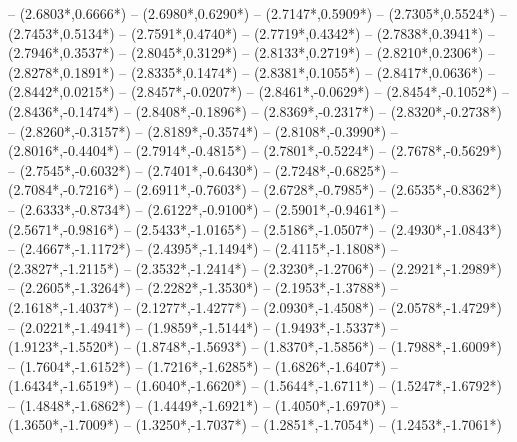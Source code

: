 {	-- ({2.6803*\dx},{0.6666*\dy})
	-- ({2.6980*\dx},{0.6290*\dy})
	-- ({2.7147*\dx},{0.5909*\dy})
	-- ({2.7305*\dx},{0.5524*\dy})
	-- ({2.7453*\dx},{0.5134*\dy})
	-- ({2.7591*\dx},{0.4740*\dy})
	-- ({2.7719*\dx},{0.4342*\dy})
	-- ({2.7838*\dx},{0.3941*\dy})
	-- ({2.7946*\dx},{0.3537*\dy})
	-- ({2.8045*\dx},{0.3129*\dy})
	-- ({2.8133*\dx},{0.2719*\dy})
	-- ({2.8210*\dx},{0.2306*\dy})
	-- ({2.8278*\dx},{0.1891*\dy})
	-- ({2.8335*\dx},{0.1474*\dy})
	-- ({2.8381*\dx},{0.1055*\dy})
	-- ({2.8417*\dx},{0.0636*\dy})
	-- ({2.8442*\dx},{0.0215*\dy})
	-- ({2.8457*\dx},{-0.0207*\dy})
	-- ({2.8461*\dx},{-0.0629*\dy})
	-- ({2.8454*\dx},{-0.1052*\dy})
	-- ({2.8436*\dx},{-0.1474*\dy})
	-- ({2.8408*\dx},{-0.1896*\dy})
	-- ({2.8369*\dx},{-0.2317*\dy})
	-- ({2.8320*\dx},{-0.2738*\dy})
	-- ({2.8260*\dx},{-0.3157*\dy})
	-- ({2.8189*\dx},{-0.3574*\dy})
	-- ({2.8108*\dx},{-0.3990*\dy})
	-- ({2.8016*\dx},{-0.4404*\dy})
	-- ({2.7914*\dx},{-0.4815*\dy})
	-- ({2.7801*\dx},{-0.5224*\dy})
	-- ({2.7678*\dx},{-0.5629*\dy})
	-- ({2.7545*\dx},{-0.6032*\dy})
	-- ({2.7401*\dx},{-0.6430*\dy})
	-- ({2.7248*\dx},{-0.6825*\dy})
	-- ({2.7084*\dx},{-0.7216*\dy})
	-- ({2.6911*\dx},{-0.7603*\dy})
	-- ({2.6728*\dx},{-0.7985*\dy})
	-- ({2.6535*\dx},{-0.8362*\dy})
	-- ({2.6333*\dx},{-0.8734*\dy})
	-- ({2.6122*\dx},{-0.9100*\dy})
	-- ({2.5901*\dx},{-0.9461*\dy})
	-- ({2.5671*\dx},{-0.9816*\dy})
	-- ({2.5433*\dx},{-1.0165*\dy})
	-- ({2.5186*\dx},{-1.0507*\dy})
	-- ({2.4930*\dx},{-1.0843*\dy})
	-- ({2.4667*\dx},{-1.1172*\dy})
	-- ({2.4395*\dx},{-1.1494*\dy})
	-- ({2.4115*\dx},{-1.1808*\dy})
	-- ({2.3827*\dx},{-1.2115*\dy})
	-- ({2.3532*\dx},{-1.2414*\dy})
	-- ({2.3230*\dx},{-1.2706*\dy})
	-- ({2.2921*\dx},{-1.2989*\dy})
	-- ({2.2605*\dx},{-1.3264*\dy})
	-- ({2.2282*\dx},{-1.3530*\dy})
	-- ({2.1953*\dx},{-1.3788*\dy})
	-- ({2.1618*\dx},{-1.4037*\dy})
	-- ({2.1277*\dx},{-1.4277*\dy})
	-- ({2.0930*\dx},{-1.4508*\dy})
	-- ({2.0578*\dx},{-1.4729*\dy})
	-- ({2.0221*\dx},{-1.4941*\dy})
	-- ({1.9859*\dx},{-1.5144*\dy})
	-- ({1.9493*\dx},{-1.5337*\dy})
	-- ({1.9123*\dx},{-1.5520*\dy})
	-- ({1.8748*\dx},{-1.5693*\dy})
	-- ({1.8370*\dx},{-1.5856*\dy})
	-- ({1.7988*\dx},{-1.6009*\dy})
	-- ({1.7604*\dx},{-1.6152*\dy})
	-- ({1.7216*\dx},{-1.6285*\dy})
	-- ({1.6826*\dx},{-1.6407*\dy})
	-- ({1.6434*\dx},{-1.6519*\dy})
	-- ({1.6040*\dx},{-1.6620*\dy})
	-- ({1.5644*\dx},{-1.6711*\dy})
	-- ({1.5247*\dx},{-1.6792*\dy})
	-- ({1.4848*\dx},{-1.6862*\dy})
	-- ({1.4449*\dx},{-1.6921*\dy})
	-- ({1.4050*\dx},{-1.6970*\dy})
	-- ({1.3650*\dx},{-1.7009*\dy})
	-- ({1.3250*\dx},{-1.7037*\dy})
	-- ({1.2851*\dx},{-1.7054*\dy})
	-- ({1.2453*\dx},{-1.7061*\dy})
}
